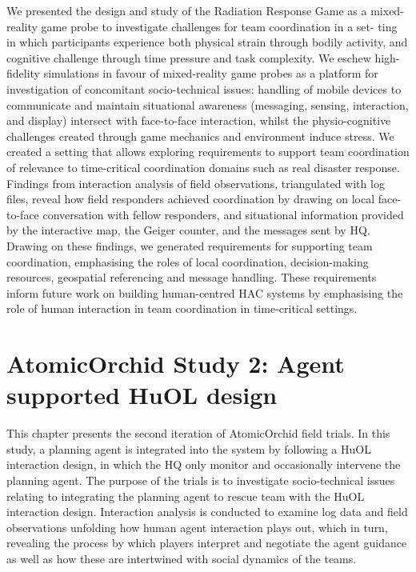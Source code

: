 We presented the design and study of the Radiation Response Game as a mixed-reality game probe to investigate challenges for team coordination in a set- ting in which participants experience both physical strain through bodily activity, and cognitive challenge through time pressure and task complexity. We eschew high-fidelity simulations in favour of mixed-reality game probes as a platform for investigation of concomitant socio-technical issues: handling of mobile devices to communicate and maintain situational awareness (messaging, sensing, interaction, and display) intersect with face-to-face interaction, whilst the physio-cognitive challenges created through game mechanics and environment induce stress. We created a setting that allows exploring requirements to support team coordination of relevance to time-critical coordination domains such as real disaster response.\\

Findings from interaction analysis of field observations, triangulated with log files, reveal how field responders achieved coordination by drawing on local face-to-face conversation with fellow responders, and situational information provided by the interactive map, the Geiger counter, and the messages sent by HQ. Drawing on these findings, we generated requirements for supporting team coordination, emphasising the roles of local coordination, decision-making resources, geospatial referencing and message handling. These requirements inform future work on building human-centred HAC systems by emphasising the role of human interaction in team coordination in time-critical settings.\\

\chapter{AtomicOrchid Study 2: Agent supported HuOL design}\label{ch:studytwo} %
This chapter presents the second iteration of AtomicOrchid field trials. In this study, a planning agent is integrated into the system by following a HuOL interaction design, in which the HQ only monitor and occasionally intervene the planning agent. The purpose of the trials is to investigate socio-technical issues relating to integrating the planning agent to rescue team with the HuOL interaction design. Interaction analysis is conducted to examine log data and field observations unfolding how human agent interaction plays out, which in turn, revealing the process by which players interpret and negotiate the agent guidance as well as how these are intertwined with social dynamics of the teams.

